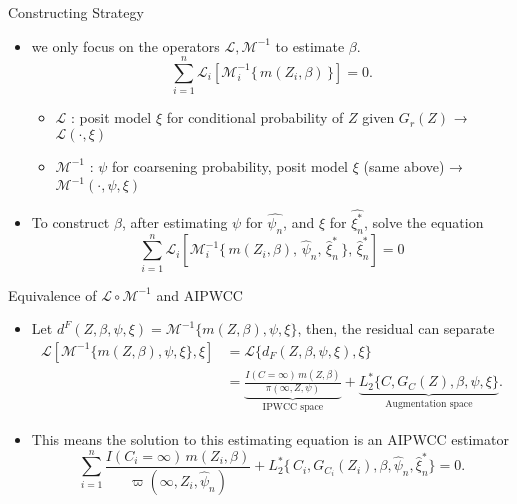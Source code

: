 \documentclass[xcolor=dvipsnames,aspectratio=169]{beamer}
\newcommand{\1}{\mathbbm{1}}
\begin{document}
\begin{frame}{Constructing Strategy}
  \begin{itemize}
    \item we only focus on the operators $\mathcal{L}, \mathcal{M}^{-1}$ to estimate $\beta$.
    \[
    \sum_{i=1}^{n}
  \mathcal{L}_{i}\!\left[
    \mathcal{M}_{i}^{-1}\{\, m(Z_{i},\beta)\,\}
  \right]
= 0.
    \]
    \begin{itemize}
      \item $\mathcal{L}$ : posit model $\xi$ for conditional probability of $Z$ given $G_r(Z)$ → $\mathcal{L}(\cdot, \xi)$
      \item $\mathcal{M}^{-1}$ : $\psi$ for coarsening probability, posit model $\xi$ (same above) → $\mathcal{M}^{-1}(\cdot, \psi, \xi)$
    \end{itemize}
    \item To construct $\beta$, after estimating $\psi$ for $\hat{\psi_n}$, and $\xi$ for $\hat{\xi_n^*}$, solve the equation
    \[
    \sum_{i=1}^{n}
  \mathcal{L}_{i}\!\left[
    \mathcal{M}_{i}^{-1}\{\, m(Z_{i},\beta),\, \hat{\psi}_{n},\, \hat{\xi}^{\ast}_{n}\,\},
    \, \hat{\xi}^{\ast}_{n}
  \right]
= 0
    \]
  \end{itemize}
\end{frame}

\begin{frame}{Equivalence of $\mathcal{L}\circ \mathcal{M}^{-1}$ and AIPWCC}
  \begin{tcolorbox}[colframe=Cyan,title=Theorem 10.7 - (i)]
    \begin{itemize}
        \item Let $d^F(Z,\beta,\psi,\xi) = \mathcal{M}^{-1}\{m(Z,\beta),\psi,\xi\}$, then, the residual can separate
        \begin{align*}
          \mathcal{L}[\mathcal{M}^{-1}\{m(Z,\beta),\psi,\xi\},\xi]
            &= \mathcal{L}\{d_F(Z,\beta,\psi,\xi),\xi\} \\
            &=\underbrace{\frac{I(C=\infty)\,m(Z,\beta)}{\pi(\infty,Z,\psi)}}_{\text{IPWCC space}}
            + \underbrace{L^{\ast}_2\{C,G_C(Z),\beta,\psi,\xi\}}_{\text{Augmentation space}}.
        \end{align*}
    \end{itemize}
\end{tcolorbox}
  \begin{itemize}
    \item This means the solution to this estimating equation is an AIPWCC estimator
    \[
    \sum_{i=1}^{n}
  \frac{I(C_{i}=\infty)\,m(Z_{i},\beta)}
       {\varpi(\infty,Z_{i},\hat{\psi}_{n})}
  + L^{\ast}_{2}\{\,C_{i},G_{C_{i}}(Z_{i}),\beta,\hat{\psi}_{n},\hat{\xi}^{\ast}_{n}\}
= 0.
    \]
  \end{itemize}
\end{frame}
\end{document}
